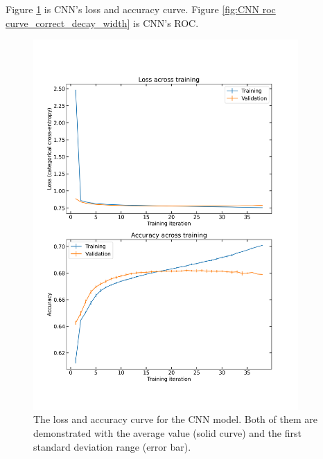 \documentclass[12pt]{article}
\begin{document}
		Figure \ref{fig:CNN learning curve_correct_decay_width} is CNN's loss and accuracy curve. Figure \ref{fig:CNN roc curve_correct_decay_width} is CNN's ROC.
		\begin{figure}[htpb]
			\centering
			\includegraphics[width=0.90\textwidth]{CNN_loss_and_accuracy_correct_width.png}
			\caption{The loss and accuracy curve for the CNN model. Both of them are demonstrated with the average value (solid curve) and the first standard deviation range (error bar).}
			\label{fig:CNN learning curve_correct_decay_width}
		\end{figure}
\end{document}
